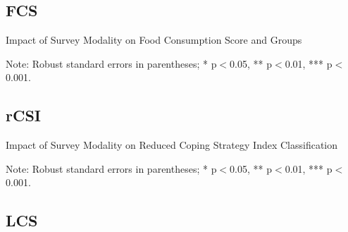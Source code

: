 \documentclass[11pt,harvard]{article}
\begin{document}
	\pagebreak
	
\subsection{FCS}
	
	\begin{table}[htbp]
		\centering
		\begin{adjustbox}{max width=\textwidth}
			\begin{threeparttable}
				\caption{Impact of Survey Modality on Food Consumption Score and Groups}
				\scriptsize
				 
				\label{tab:FCS_Modality_CAR}
				\begin{tablenotes}
					\item Note: Robust standard errors in parentheses; * p$<$0.05, ** p$<$0.01, *** p$<$0.001. 
				\end{tablenotes}
			\end{threeparttable}
		\end{adjustbox}
	\end{table}
	
	\pagebreak	

	\subsection{rCSI}
	
	\begin{table}[htbp]
		\centering
		\begin{adjustbox}{max width=\textwidth}
			\begin{threeparttable}
				\caption{Impact of Survey Modality on Reduced Coping Strategy Index Classification}
				\scriptsize
				 
				\label{tab:rCSI_Modality_CAR}
				\begin{tablenotes}
					\item Note: Robust standard errors in parentheses; * p$<$0.05, ** p$<$0.01, *** p$<$0.001. 
				\end{tablenotes}
			\end{threeparttable}
		\end{adjustbox}
	\end{table}
	\pagebreak
	
	\subsection{LCS}
	
\end{document}
